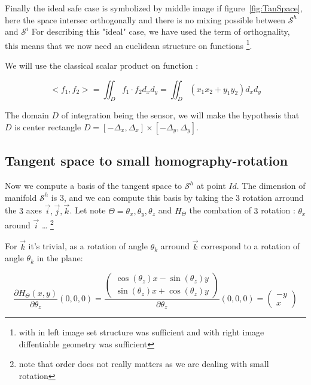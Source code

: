 Finally the ideal safe case is symbolized by middle image if figure~\ref{fig:TanSpace}, here
the space intersec orthogonally and there is no mixing possible between $\mathcal{S}^h$ and $\mathcal{S}^i$
For describing this "ideal" case, we have used the term of orthognality, this means that
we  now need an euclidean structure on functions \footnote{with in left image set structure was sufficient
and with right image diffentiable geometry was sufficient}.

We will use the classical scalar product on function :

\begin{equation}
	<f_1,f_2> = \iint_D  f_1 \cdot f_2 d_x d_y  = \iint_D  (x_1 x_2 + y_1 y_2) d_x d_y \label{ProdScalFunc}
\end{equation}

The domain $D$ of integration being the sensor, we will make the hypothesis that $D$ is center rectangle 
$D = [-\Delta_x,\Delta_x] \times [-\Delta_y,\Delta_y] $.



\subsection{Tangent space to small homography-rotation}

Now we compute a basis of the tangent space to $\mathcal{S}^h$ at point $Id$.
The dimension of manifold $\mathcal{S}^h$ is $3$, and we can compute this basis
by taking the $3$ rotation arround the $3$ axes $\vec{i},\vec{j},\vec{k}$.
Let note $\Theta= \theta_x,\theta_y,\theta_z$  and $H_\Theta$ the
combation of $3$ rotation : $\theta_x$ around $\vec{i}$ \dots
\footnote{note that order does not really matters as we are dealing with small rotation}


For $\vec{k}$ it's trivial, as a rotation of angle $\theta_k$ arround 
$\vec{k}$ correspond to a rotation of angle $\theta_k$ in the plane:

\begin{equation}
	\frac{\partial H_\Theta(x,y)}{\partial \theta_z} (0,0,0) 
	= \frac{\begin{pmatrix} \cos(\theta_z) x - \sin(\theta_z)y \\ \sin(\theta_z)x + \cos(\theta_z)y \end{pmatrix}}{\partial \theta_z}  (0,0,0)
	= \begin{pmatrix} -y \\  x \end{pmatrix}
\end{equation}

